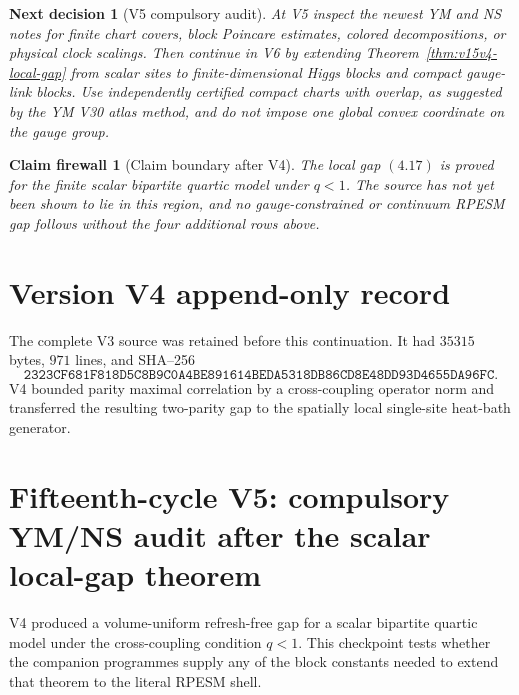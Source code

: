 \documentclass[11pt]{article}
\newtheorem{firewall}[theorem]{Claim firewall}
\newtheorem{decision}[theorem]{Next decision}
\theoremstyle{remark}
\begin{document}
\begin{decision}[V5 compulsory audit]
\label{dec:v15v4-next}
At V5 inspect the newest YM and NS notes for finite chart covers,
block Poincare estimates, colored decompositions, or physical
clock scalings.  Then continue in V6 by extending
Theorem~\ref{thm:v15v4-local-gap} from scalar sites to
finite-dimensional Higgs blocks and compact gauge-link blocks.
Use independently certified compact charts with overlap, as
suggested by the YM V30 atlas method, and do not impose one global
convex coordinate on the gauge group.
\end{decision}

\begin{firewall}[Claim boundary after V4]
\label{fire:v15v4}
The local gap \((4.17)\) is proved for the finite scalar bipartite
quartic model under \(q<1\).  The source has not yet been shown to
lie in this region, and no gauge-constrained or continuum RPESM
gap follows without the four additional rows above.
\end{firewall}

\section*{Version V4 append-only record}
The complete V3 source was retained before this continuation.  It
had \(35315\) bytes, \(971\) lines, and SHA--256
\[
 \texttt{2323CF681F818D5C8B9C0A4BE891614BEDA5318DB86CD8E48DD93D4655DA96FC}.
\]
V4 bounded parity maximal correlation by a cross-coupling
operator norm and transferred the resulting two-parity gap to the
spatially local single-site heat-bath generator.


\section{Fifteenth-cycle V5: compulsory YM/NS audit after the scalar local-gap theorem}
\label{sec:v15v5}

V4 produced a volume-uniform refresh-free gap for a scalar
bipartite quartic model under the cross-coupling condition
\(q<1\).  This checkpoint tests whether the companion programmes
supply any of the block constants needed to extend that theorem to
the literal RPESM shell.
\end{document}

